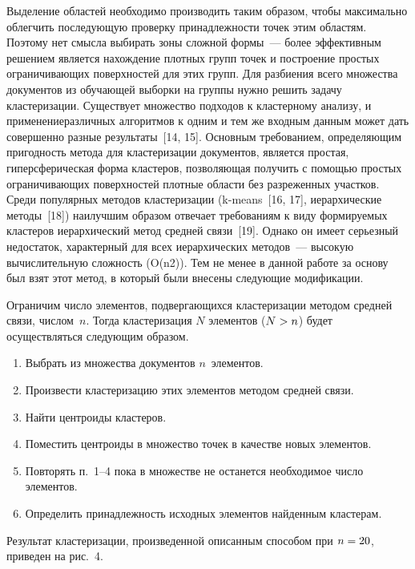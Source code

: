 \begin{multicols}{2}
    Выделение областей необходимо производить таким образом, чтобы 
максимально облегчить последующую проверку принадлежности точек этим 
областям. Поэтому нет смысла выбирать зоны сложной формы~--- более 
эффективным решением является нахождение плотных групп точек и 
построение простых ограничивающих поверхностей для этих групп. Для 
разбиения всего множества документов из обучающей выборки на группы 
нужно решить задачу кластеризации. Существует множество подходов к 
кластерному анализу, и применение\linebreak различных алгоритмов к одним и тем же 
входным данным может дать совершенно разные результаты~[14, 15]. 
Основным требованием, опре\-де\-ля\-ющим пригодность метода для кластеризации 
документов, является простая, гиперсферическая\linebreak
 форма кластеров, 
позволяющая получить с по\-мощью простых ограничивающих поверхностей 
плотные области без разреженных участков. Среди популярных методов 
кластеризации (k-means~[16, 17], иерархические методы~[18]) наилучшим 
образом отвечает требованиям к виду формируемых клас\-те\-ров иерархический 
метод средней связи~[19]. Однако он имеет серьезный недостаток, характерный 
для всех иерархических методов~--- высокую вычислительную сложность 
(O(n2)). Тем не менее в данной работе за основу был взят этот метод, в который 
были внесены следующие модификации.
  
    Ограничим число элементов, подвергающихся кластеризации методом 
средней связи, числом~$n$. Тогда кластеризация $N$ элементов ($N\hm>n$) 
будет осуществляться следующим образом.
  \begin{enumerate}[1.]
\item Выбрать из множества документов $n$~элементов.
\item Произвести кластеризацию этих элементов методом средней связи.
\item Найти центроиды кластеров.
\item Поместить центроиды в множество точек в качестве новых элементов.
\item Повторять п.~1--4 пока в множестве не останется необходимое 
число элементов.
\item Определить принадлежность исходных элементов найденным 
кластерам.
\end{enumerate}

    Результат кластеризации, произведенной описанным способом при 
$n\hm = 20$, приведен на рис.~4.




\end{multicols}
